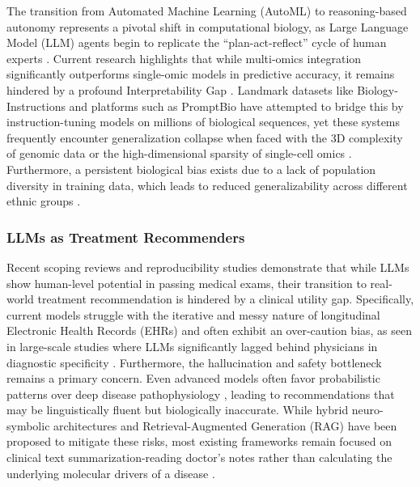 \documentclass{article}
\begin{document}
The transition from Automated Machine Learning (AutoML) to reasoning-based autonomy represents a pivotal shift in computational biology, as Large Language Model (LLM) agents begin to replicate the ``plan-act-reflect'' cycle of human experts \cite{martinek2025agentomics, qu2025automating}. Current research highlights that while multi-omics integration significantly outperforms single-omic models in predictive accuracy, it remains hindered by a profound Interpretability Gap \cite{zack2025ai, vavekanand2026comprehensive}. Landmark datasets like Biology-Instructions and platforms such as PromptBio have attempted to bridge this by instruction-tuning models on millions of biological sequences, yet these systems frequently encounter generalization collapse when faced with the 3D complexity of genomic data or the high-dimensional sparsity of single-cell omics \cite{martinek2025agentomics, he2025biology, ali2025genomics, dip2025llm4cell, yang2025promptbio}. Furthermore, a persistent biological bias exists due to a lack of population diversity in training data, which leads to reduced generalizability across different ethnic groups \cite{zack2025ai, dip2025llm4cell, vavekanand2026comprehensive}. 

\subsubsection{LLMs as Treatment Recommenders}
Recent scoping reviews and reproducibility studies \cite{zhou2025large, meng2024application} demonstrate that while LLMs show human-level potential in passing medical exams, their transition to real-world treatment recommendation is hindered by a clinical utility gap. Specifically, current models struggle with the iterative and messy nature of longitudinal Electronic Health Records (EHRs) \cite{zhou2025large, williams2024evaluating} and often exhibit an over-caution bias, as seen in large-scale studies where LLMs significantly lagged behind physicians in diagnostic specificity \cite{williams2024evaluating, yang2025application}. Furthermore, the hallucination and safety bottleneck remains a primary concern. Even advanced models often favor probabilistic patterns over deep disease pathophysiology \cite{meng2024application}, leading to recommendations that may be linguistically fluent but biologically inaccurate. While hybrid neuro-symbolic architectures \cite{galitsky2024personalized} and Retrieval-Augmented Generation (RAG) \cite{zhou2025large, lin2025roles} have been proposed to mitigate these risks, most existing frameworks remain focused on clinical text summarization-reading doctor's notes rather than calculating the underlying molecular drivers of a disease \cite{lin2025roles, williams2024evaluating}.  
\end{document}
